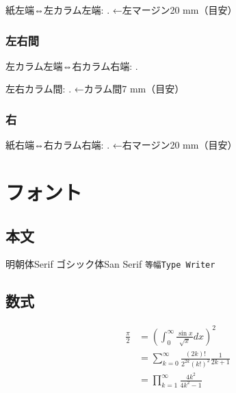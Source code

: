 \documentclass{FITpaper}
\begin{document}
\newlength{\myleft}
\setlength{\myleft}{\oddsidemargin}

\addtolength\myleft{1in}

紙左端⇔左カラム左端:
\prntlen{\myleft}.
←左マージン20 mm（目安）

\subsubsection{左右間}

左カラム左端⇔右カラム右端:
\prntlen{\textwidth}.

左右カラム間:
\prntlen{\columnsep}.
←カラム間7 mm（目安）

\subsubsection{右}

\newlength{\myright}
\setlength{\myright}{\paperwidth}

\addtolength\myright{-\myleft}
\addtolength\myright{-\textwidth}

紙右端⇔右カラム右端:
\prntlen{\myright}.
←右マージン20 mm（目安）

\section{フォント}

\subsection{本文}

明朝体Serif
\textsf{ゴシック体San Serif}
\texttt{等幅Type Writer}

\subsection{数式}

\begin{align}
  \frac{\pi}{2} &=
  \left( \int_{0}^{\infty} \frac{\sin x}{\sqrt{x}} dx \right)^2 \nonumber \\
  &= \sum_{k=0}^{\infty} \frac{(2k)!}{2^{2k}(k!)^2} \frac{1}{2k+1} \nonumber \\
  &= \prod_{k=1}^{\infty} \frac{4k^2}{4k^2 - 1} \nonumber
\end{align}

\end{document}
